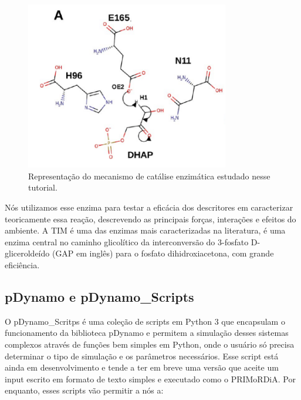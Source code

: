 \documentclass[a4paper,11pt]{refart}
\begin{document}
	\hspace*{-\leftmarginwidth}
	\begin{minipage}{\fullwidth}
		\begin{figure}[H]
			\begin{center}
				\includegraphics[width=3.5in]{mecanismo}
				\caption{Representação do mecanismo de catálise enzimática estudado nesse tutorial.}
				\label{fig_tut6_0}
			\end{center}
		\end{figure}
	\end{minipage}
	
	Nós utilizamos esse enzima para testar a eficácia dos descritores em caracterizar teoricamente essa reação, descrevendo as principais forças, interações e efeitos do ambiente. A TIM é uma das enzimas mais caracterizadas na literatura, é uma enzima central no caminho glicolítico da interconversão do 3-fosfato D-gliceroldeído (GAP em inglês) para o fosfato dihidroxiacetona, com grande eficiência.
	
	
	
	\subsection{pDynamo e pDynamo\_Scripts} 
	
	O pDynamo\_Scritps é uma coleção de scripts em Python 3 que encapsulam o funcionamento da biblioteca pDynamo e permitem a simulação desses sistemas complexos através de funções bem simples em Python, onde o usuário só precisa determinar o tipo de simulação e os parâmetros necessários. Esse script está ainda em desenvolvimento e tende a ter em breve uma versão que aceite um input escrito em formato de texto simples e executado como o PRIMoRDiA. Por enquanto, esses scripts vão permitir a nós a:
	
\end{document}
